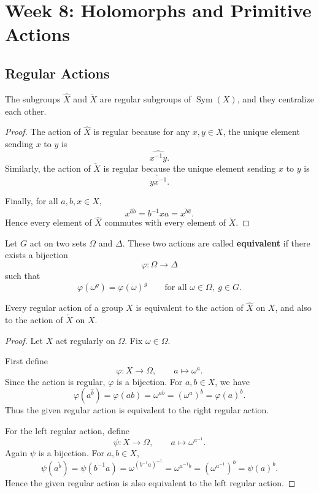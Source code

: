 \chapter{Week 8: Holomorphs and Primitive Actions}

\section{Regular Actions}

\begin{lemma}
The subgroups \(\widehat X\) and \(\check X\) are regular subgroups of
\(\operatorname{Sym}(X)\), and they centralize each other.
\end{lemma}

\begin{proof}
The action of \(\widehat X\) is regular because for any \(x,y\in X\), the unique
element sending \(x\) to \(y\) is
\[
    \widehat{x^{-1}y}.
\]
Similarly, the action of \(\check X\) is regular because the unique element sending
\(x\) to \(y\) is
\[
    \check{yx^{-1}}.
\]

Finally, for all \(a,b,x\in X\),
\[
    x^{\widehat a\check b}
    =
    b^{-1}xa
    =
    x^{\check b\widehat a}.
\]
Hence every element of \(\widehat X\) commutes with every element of
\(\check X\).
\end{proof}

\begin{definition}
Let \(G\) act on two sets \(\Omega\) and \(\Delta\). These two actions are called
\textbf{equivalent} if there exists a bijection
\[
    \varphi:\Omega\to\Delta
\]
such that
\[
    \varphi(\omega^g)=\varphi(\omega)^g
    \qquad
    \text{for all } \omega\in\Omega,\ g\in G.
\]
\end{definition}

\begin{corollary}
Every regular action of a group \(X\) is equivalent to the action of
\(\widehat X\) on \(X\), and also to the action of \(\check X\) on \(X\).
\end{corollary}

\begin{proof}
Let \(X\) act regularly on \(\Omega\). Fix \(\omega\in\Omega\).

First define
\[
    \varphi:X\to\Omega,
    \qquad
    a\mapsto \omega^a.
\]
Since the action is regular, \(\varphi\) is a bijection. For \(a,b\in X\), we have
\[
    \varphi(a^{\widehat b})
    =
    \varphi(ab)
    =
    \omega^{ab}
    =
    (\omega^a)^b
    =
    \varphi(a)^b.
\]
Thus the given regular action is equivalent to the right regular action.

For the left regular action, define
\[
    \psi:X\to\Omega,
    \qquad
    a\mapsto \omega^{a^{-1}}.
\]
Again \(\psi\) is a bijection. For \(a,b\in X\),
\[
    \psi(a^{\check b})
    =
    \psi(b^{-1}a)
    =
    \omega^{(b^{-1}a)^{-1}}
    =
    \omega^{a^{-1}b}
    =
    (\omega^{a^{-1}})^b
    =
    \psi(a)^b.
\]
Hence the given regular action is also equivalent to the left regular action.
\end{proof}


